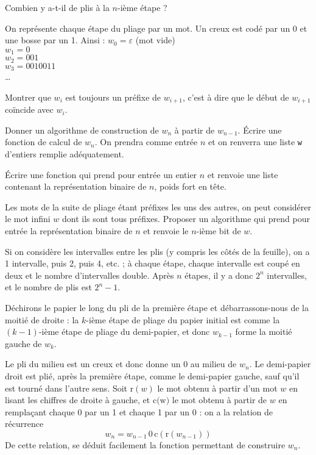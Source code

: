 \Q
Combien y a-t-il de plis à la $n$-ième étape ?

\Q
On représente chaque étape du pliage par un mot. Un creux est codé par un 0 et une bosse par un 1. Ainsi : $w_0=\varepsilon$ (mot vide)\\
$w_1=0$\\
$w_2=001$\\
$w_3=0010011$\\
\dots
\medskip

Montrer que $w_i$ est toujours un préfixe de $w_{i+1}$, c'est à dire que le début de $w_{i+1}$ coïncide avec $w_i$.

\Q
Donner un algorithme de construction de $w_n$ à partir de $w_{n-1}$. Écrire une fonction de calcul de $w_n$. On prendra comme entrée $n$ et on renverra une liste \texttt{w} d'entiers remplie adéquatement.

\Q
Écrire une fonction qui prend pour entrée un entier $n$ et renvoie une liste contenant la représentation binaire de $n$, poids fort en tête.

\Q
Les mots de la suite de pliage étant préfixes les uns des autres, on peut considérer le mot infini $w$ dont ils sont tous préfixes. Proposer un algorithme qui prend pour entrée la représentation binaire de $n$ et renvoie le $n$-ième bit de $w$.

\Corrige

\Q
Si on considère les intervalles entre les plis (y compris les côtés de la feuille), on a 1 intervalle, puis 2, puis 4, etc. ; à chaque étape, chaque intervalle est coupé en deux et le nombre d'intervalles double. Après $n$ étapes, il y a donc $2^n$ intervalles, et le nombre de plis est $2^n-1$.

\Q
Déchirons le papier le long du pli de la première étape et débarrassons-nous de la moitié de droite : la $k$-ième étape de pliage du papier initial est comme la $(k-1)$-ième étape de pliage du demi-papier, et donc $w_{k-1}$ forme la moitié gauche de $w_k$.

\Q
Le pli du milieu est un creux et donc donne un 0 au milieu de $w_n$. Le demi-papier droit est plié, après la première étape, comme le demi-papier gauche, sauf qu'il est tourné dans l'autre sens. Soit $\textrm{r}(w)$ le mot obtenu à partir d'un mot $w$ en lisant les chiffres de droite à gauche, et $\textrm{c(w)}$ le mot obtenu à partir de $w$ en remplaçant chaque 0 par un 1 et chaque 1 par un 0 : on a la relation de récurrence
\[
    w_n = w_{n-1}\,0\,\textrm{c}(\textrm{r}(w_{n-1}))
\]
De cette relation, se déduit facilement la fonction permettant de construire $w_n$.

